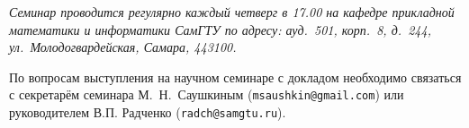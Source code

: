 \bigskip

{\small  \sl
Семинар проводится регулярно каждый четверг в 17.00 на кафедре прикладной математики и информатики СамГТУ по адресу:
ауд.~501, корп.~8, д.~244, ул.~Молодогвардейская, Самара, 443100.


По вопросам выступления на научном семинаре с докладом необходимо связаться с секретарём семинара М.~Н.~Саушкиным ({\tt msaushkin@gmail.com}) или
 руководителем В.П. Радченко ({\tt radch@samgtu.ru}).
}

%
